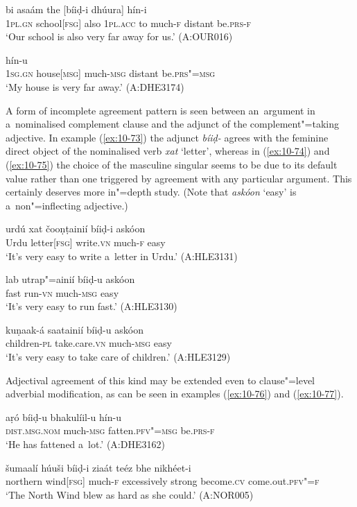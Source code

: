 \begin{exe}
\ex
\label{ex:10-71}
 bi asaám the [bíiḍ-i dhúura] hín-i \\
\textsc{1pl.gn} school[\textsc{fsg}] also \textsc{1pl.acc} to much-\textsc{f} distant be.\textsc{prs-f}  \\
\glt `Our school is also very far away for us.' (A:OUR016)

\ex
\label{ex:10-72}
 hín-u \\
\textsc{1sg.gn} house[\textsc{msg}] much-\textsc{msg} distant be.\textsc{prs"=msg}  \\
\glt `My house is very far away.' (A:DHE3174)
\end{exe}

A form of incomplete agreement pattern is seen between an~argument in a~nominalised complement clause and the adjunct of the complement"=taking adjective. In example (\ref{ex:10-73}) the adjunct \textit{bíiḍ-} agrees with the feminine direct object of the nominalised verb \textit{xat} `letter', whereas in (\ref{ex:10-74}) and (\ref{ex:10-75}) the choice of the masculine singular seems to be due to its default value rather than one triggered by agreement with any particular argument. This certainly deserves more in"=depth study. (Note that \textit{askóon} `easy' is a~non"=inflecting adjective.)

\begin{exe}
\ex
\label{ex:10-73}
\gll urdú xat čooṇṭainií bíiḍ-i askóon \\
Urdu letter[\textsc{fsg}] write.\textsc{vn} much-\textsc{f} easy  \\
\glt `It's very easy to write a~letter in Urdu.' (A:HLE3131)

\ex
\label{ex:10-74}
\gll lab utrap"=ainií bíiḍ-u askóon \\
fast run-\textsc{vn} much-\textsc{msg} easy \\
\glt `It's very easy to run fast.' (A:HLE3130)

\ex
\label{ex:10-75}
\gll kuṇaak-á saatainií bíiḍ-u askóon \\
children-\textsc{pl} take.care.\textsc{vn} much-\textsc{msg} easy \\
\glt `It's very easy to take care of children.' (A:HLE3129)
\end{exe}

Adjectival agreement of this kind may be extended even to clause"=level adverbial modification, as can be seen in examples (\ref{ex:10-76}) and (\ref{ex:10-77}).

\begin{exe}
\ex
\label{ex:10-76}
\gll aṛó bíiḍ-u bhakulíil-u hín-u \\
 \textsc{dist.msg.nom} much-\textsc{msg} fatten.\textsc{pfv"=msg} be.\textsc{prs-f} \\
\glt `He has fattened a~lot.' (A:DHE3162)

\ex
\label{ex:10-77}
\gll šumaalí húuši bíiḍ-i ziaát teéz bhe nikhéet-i\\
northern wind[\textsc{fsg}] much-\textsc{f} excessively strong become.\textsc{cv} come.out.\textsc{pfv"=f}\\
\glt `The North Wind blew as hard as she could.' (A:NOR005)
\end{exe}